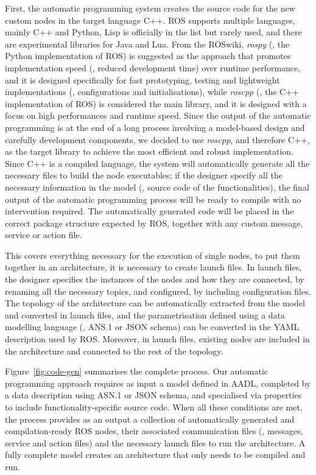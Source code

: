 First, the automatic programming system creates the source code for the new custom nodes in the target language C++. ROS supports multiple languages, mainly C++ and Python, Lisp is officially in the list but rarely used, and there are experimental libraries for Java and Lua. From the ROSwiki, \textit{rospy} (\ie, the Python implementation of ROS) is suggested as the approach that promotes implementation speed (\ie, reduced development time) over runtime performance, and it is designed specifically for fast prototyping, testing and lightweight implementations (\eg, configurations and initialisations), while \textit{roscpp} (\ie, the C++ implementation of ROS) is considered the main library, and it is designed with a focus on high performances and runtime speed. Since the output of the automatic programming is at the end of a long process involving a model-based design and carefully development components, we decided to use \textit{roscpp}, and therefore C++, as the target library to achieve the most efficient and robust implementation. Since C++ is a compiled language, the system will automatically generate all the necessary files to build the node executables; if the designer specify all the necessary information in the model (\ie, source code of the functionalities), the final output of the automatic programming process will be ready to compile with no intervention required. The automatically generated code will be placed in the correct package structure expected by ROS, together with any custom message, service or action file.

This covers everything necessary for the execution of single nodes, to put them together in an architecture, it is necessary to create launch files. In launch files, the designer specifies the instances of the nodes and how they are connected, by renaming all the necessary topics, and configured, by including configuration files. The topology of the architecture can be automatically extracted from the model and converted in launch files, and the parametrisation defined using a data modelling language (\ie, ANS.1 or JSON schema) can be converted in the YAML description used by ROS. Moreover, in launch files, existing nodes are included in the architecture and connected to the rest of the topology.

Figure~\ref{fig:code-gen} summarises the complete process. Our automatic programming approach requires as input a model defined in AADL, completed by a data description using ASN.1 or JSON schema, and specialised via properties to include functionality-specific source code. When all these conditions are met, the process provides as an output a collection of automatically generated and compilation-ready ROS nodes, their associated communication files (\ie, messages, service and action files) and the necessary launch files to run the architecture. A fully complete model creates an architecture that only needs to be compiled and run.


